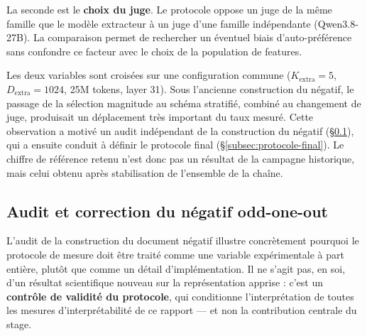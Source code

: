 \documentclass[11pt]{article}
\begin{document}
La seconde est le \textbf{choix du juge}. Le protocole oppose un juge de la même
famille que le modèle extracteur à un juge d'une famille indépendante (Qwen3.8-27B).
La comparaison permet de rechercher un éventuel biais d'auto-préférence sans confondre
ce facteur avec le choix de la population de features.

Les deux variables sont croisées sur une configuration commune
($K_\text{extra}=5$, $D_\text{extra}=1024$, 25M tokens, layer 31). Sous l'ancienne
construction du négatif, le passage de la sélection magnitude au schéma stratifié,
combiné au changement de juge, produisait un déplacement très important du taux
mesuré. Cette observation a motivé un audit indépendant de la construction du négatif
(\S\ref{subsec:audit-negatif}), qui a ensuite conduit à définir le protocole final
(\S\ref{subsec:protocole-final}). Le chiffre de référence retenu
n'est donc pas un résultat de la campagne historique, mais celui obtenu après
stabilisation de l'ensemble de la chaîne.

\subsection{Audit et correction du négatif odd-one-out}
\label{subsec:audit-negatif}

L'audit de la construction du document négatif illustre concrètement pourquoi
le protocole de mesure doit être traité comme une variable expérimentale à
part entière, plutôt que comme un détail d'implémentation. Il ne s'agit pas,
en soi, d'un résultat scientifique nouveau sur la représentation apprise :
c'est un \textbf{contrôle de validité du protocole}, qui conditionne
l'interprétation de toutes les mesures d'interprétabilité de ce rapport ---
et non la contribution centrale du stage.
\end{document}
